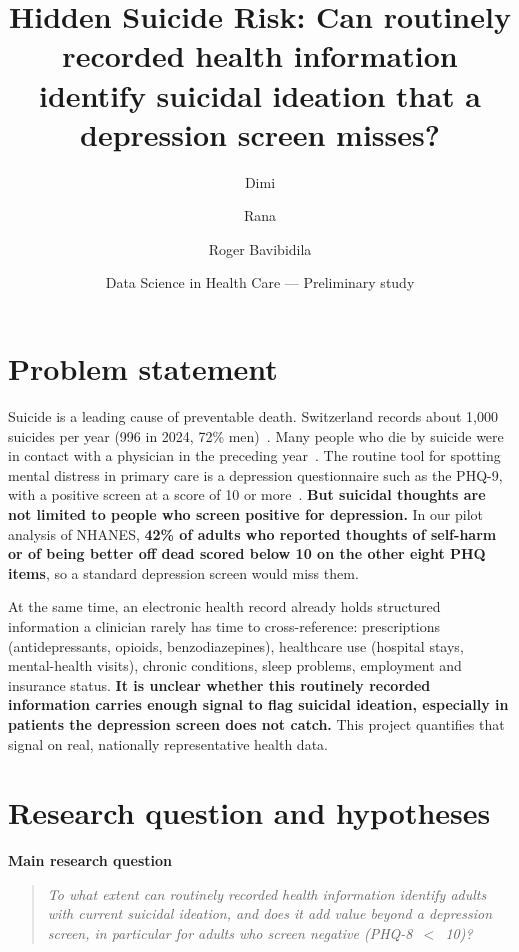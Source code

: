 \documentclass[11pt,a4paper]{article}
\title{\textbf{Hidden Suicide Risk:} Can routinely recorded health information
       identify suicidal ideation that a depression screen misses?}
\author{Dimi \and Rana \and Roger Bavibidila}
\date{Data Science in Health Care --- Preliminary study}
\begin{document}
\maketitle

\section{Problem statement}

Suicide is a leading cause of preventable death. Switzerland records about 1,000
suicides per year (996 in 2024, 72\% men)~\cite{bfs2026}. Many people who die by
suicide were in contact with a physician in the preceding year~\cite{ahmedani2014}.
The routine tool for spotting mental distress in primary care is a depression
questionnaire such as the PHQ-9, with a positive screen at a score of 10 or
more~\cite{kroenke2001}. \textbf{But suicidal thoughts are not limited to people who
screen positive for depression.} In our pilot analysis of NHANES, \textbf{42\% of
adults who reported thoughts of self-harm or of being better off dead scored below 10
on the other eight PHQ items}, so a standard depression screen would miss them.

At the same time, an electronic health record already holds structured information a
clinician rarely has time to cross-reference: prescriptions (antidepressants, opioids,
benzodiazepines), healthcare use (hospital stays, mental-health visits), chronic
conditions, sleep problems, employment and insurance status. \textbf{It is unclear
whether this routinely recorded information carries enough signal to flag suicidal
ideation, especially in patients the depression screen does not catch.} This project
quantifies that signal on real, nationally representative health data.

\section{Research question and hypotheses}

\textbf{Main research question}
\begin{quote}
\itshape To what extent can routinely recorded health information identify adults with
current suicidal ideation, and does it add value beyond a depression screen, in
particular for adults who screen negative (PHQ-8~$<$~10)?
\end{quote}
\end{document}
